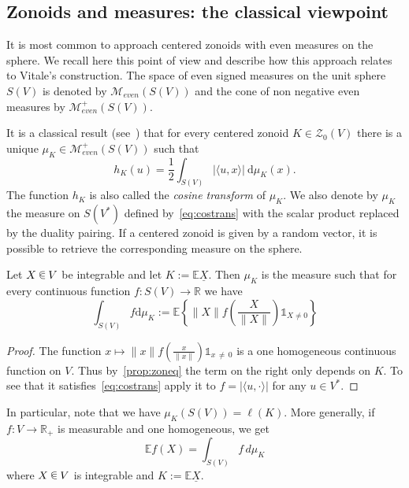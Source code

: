 \documentclass[AHL, Unicode, longabstracts, published]{cedram}
\newcommand{\R}{\mathbb{R}}
\newcommand{\EE}{\mathbb{E}}
\newcommand{\ZZo}{\mathscr{Z}_0}
\newcommand{\dd}{\mathrm{d}}
\newcommand{\Mev}{\mathcal{M}_{even}}
\newcommand{\one}{\mathds{1}}
\newcommand{\seg}{\underline}
\newcommand*\randin{
\mathchoice {\raisebox{-.35ex}{$\displaystyle{^\subset}$}\mkern-11.5mu\raisebox{+.45ex}{$\displaystyle{_\subset}$}} {\mkern+1mu\raisebox{-.27ex}{$\textstyle{^\subset}$}\mkern-11.7mu\raisebox{+.45ex}{$\textstyle{_\subset}$}} {\raisebox{.35ex}{$\scriptstyle\subset$}\mkern-14mu\raisebox{-.15ex}{$\scriptstyle\subset$}} {\raisebox{.3ex}{$\scriptscriptstyle\subset$}\mkern-13.5mu\raisebox{-.10ex}{$\scriptscriptstyle\subset$}}}
\begin{document}
\subsection{Zonoids and measures: the classical viewpoint}\label{sec:zonandmeas}

It is most common to approach centered zonoids with even measures on the sphere. We recall here this point of view and describe how this approach relates to Vitale's construction. The space of even signed measures on the unit sphere $S(V)$ is denoted by $\Mev(S(V))$ and the cone of non negative even measures by $\Mev^+(S(V))$.

It is a classical result (see~\cite[Theorem~3.5.3]{bible}) that for every centered zonoid $K\in\ZZo(V)$ there is a unique $\mu_K\in\Mev^+(S(V))$ such that
\begin{equation}\label{eq:costrans}
h_K(u)=\frac{1}{2}\int_{S(V)}|\langle u, x \rangle| \ \dd\mu_K(x).
\end{equation}
The function $h_K$ is also called the \emph{cosine transform} of $\mu_K$. We also denote by $\mu_K$ the measure on $S(V^*)$ defined by~\eqref{eq:costrans} with the scalar product replaced by the duality pairing. If a centered zonoid is given by a random vector, it is possible to retrieve the corresponding measure on the sphere.

\begin{prop}\label{prop:fromrvtomeas}
Let $X\,\randin\, V$ be integrable and let $K:=\EE\seg{X}$. Then $\mu_K$ is the measure such that for every continuous function $f:S(V)\to\R$ we have
\begin{equation}\label{eq:forMUla}
\int_{S(V)}f \dd\mu_K:=\EE\left\{\|X\|f\left(\frac{X}{\|X\|}\right)\one_{X\neq 0}\right\}
\end{equation}
\end{prop}

\begin{proof}
The function $x\mapsto\|x\|f(\frac{x}{\|x\|})\one_{x\,\neq\,0}$ is a one homogeneous continuous function on $V$. Thus by~\cref{prop:zoneq} the term on the right only depends on $K$. To see that it satisfies~\eqref{eq:costrans} apply it to $f=|\langle u, \cdot\rangle|$ for any $u\in V^*$.
\end{proof}

In particular, note that we have $\mu_K(S(V))=\ell(K)$. More generally, if $f:V\to\R_+$ is measurable and one homogeneous, we get
\begin{equation}\label{eq:intwrtgenmeas}
\EE f(X)=\int_{S(V)}f\, d\mu_K
\end{equation}
where $X\,\randin\, V$ is integrable and $K:=\EE\seg{X}$.
\end{document}
